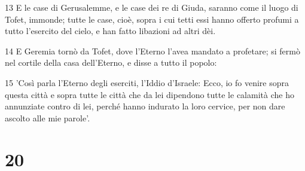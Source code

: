 \par 13 E le case di Gerusalemme, e le case dei re di Giuda, saranno come il luogo di Tofet, immonde; tutte le case, cioè, sopra i cui tetti essi hanno offerto profumi a tutto l'esercito del cielo, e han fatto libazioni ad altri dèi.
\par 14 E Geremia tornò da Tofet, dove l'Eterno l'avea mandato a profetare; si fermò nel cortile della casa dell'Eterno, e disse a tutto il popolo:
\par 15 'Così parla l'Eterno degli eserciti, l'Iddio d'Israele: Ecco, io fo venire sopra questa città e sopra tutte le città che da lei dipendono tutte le calamità che ho annunziate contro di lei, perché hanno indurato la loro cervice, per non dare ascolto alle mie parole'.

\chapter{20}

